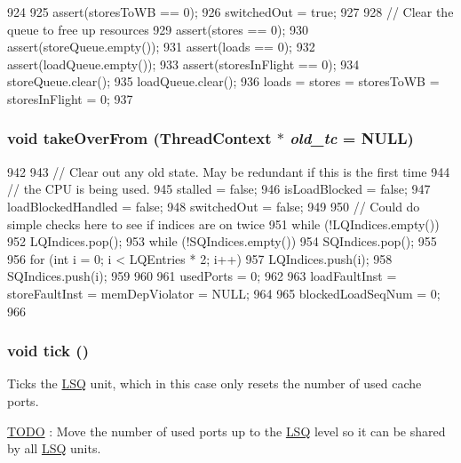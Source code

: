 \begin{DoxyCode}
924 {
925     assert(storesToWB == 0);
926     switchedOut = true;
927 
928     // Clear the queue to free up resources
929     assert(stores == 0);
930     assert(storeQueue.empty());
931     assert(loads == 0);
932     assert(loadQueue.empty());
933     assert(storesInFlight == 0);
934     storeQueue.clear();
935     loadQueue.clear();
936     loads = stores = storesToWB = storesInFlight = 0;
937 }
\end{DoxyCode}
\hypertarget{classOzoneLWLSQ_a5a901e7ec5b94a55bd61fde88ad0b7f1}{
\subsubsection[{takeOverFrom}]{\setlength{\rightskip}{0pt plus 5cm}void takeOverFrom ({\bf ThreadContext} $\ast$ {\em old\_\-tc} = {\ttfamily NULL})}}
\label{classOzoneLWLSQ_a5a901e7ec5b94a55bd61fde88ad0b7f1}



\begin{DoxyCode}
942 {
943     // Clear out any old state. May be redundant if this is the first time
944     // the CPU is being used.
945     stalled = false;
946     isLoadBlocked = false;
947     loadBlockedHandled = false;
948     switchedOut = false;
949 
950     // Could do simple checks here to see if indices are on twice
951     while (!LQIndices.empty())
952         LQIndices.pop();
953     while (!SQIndices.empty())
954         SQIndices.pop();
955 
956     for (int i = 0; i < LQEntries * 2; i++) {
957         LQIndices.push(i);
958         SQIndices.push(i);
959     }
960 
961     usedPorts = 0;
962 
963     loadFaultInst = storeFaultInst = memDepViolator = NULL;
964 
965     blockedLoadSeqNum = 0;
966 }
\end{DoxyCode}
\hypertarget{classOzoneLWLSQ_a873dd91783f9efb4a590aded1f70d6b0}{
\subsubsection[{tick}]{\setlength{\rightskip}{0pt plus 5cm}void tick ()}}
\label{classOzoneLWLSQ_a873dd91783f9efb4a590aded1f70d6b0}
Ticks the \hyperlink{classLSQ}{LSQ} unit, which in this case only resets the number of used cache ports. \begin{Desc}
\item[\hyperlink{todo__todo000046}{TODO}]: Move the number of used ports up to the \hyperlink{classLSQ}{LSQ} level so it can be shared by all \hyperlink{classLSQ}{LSQ} units. \end{Desc}



